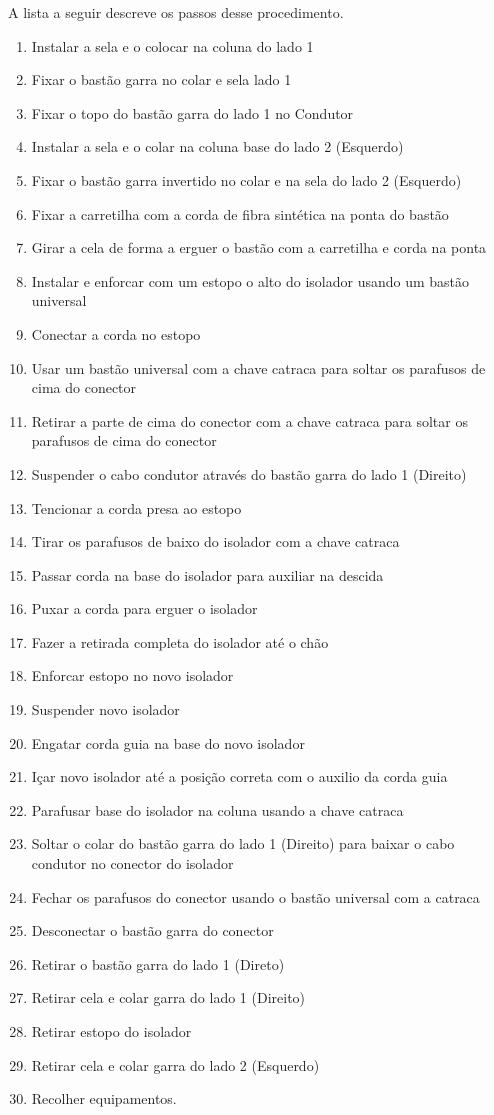 A lista a seguir descreve os passos desse procedimento.
\begin{enumerate}
\item Instalar a sela e o colocar na coluna do lado 1
\item Fixar o bastão garra no colar e sela lado 1
\item Fixar o topo do bastão garra do lado 1 no Condutor
\item Instalar a sela e o colar na coluna base do lado 2 (Esquerdo)
\item Fixar o bastão garra invertido no colar e na sela do lado 2 (Esquerdo)
\item Fixar a carretilha com a corda de fibra sintética na ponta do bastão
\item Girar a cela de forma a erguer o bastão com a carretilha e corda na ponta
\item Instalar e enforcar com um estopo o alto do isolador usando um bastão universal
\item Conectar a corda no estopo
\item Usar um bastão universal com a chave catraca para soltar os parafusos de cima do conector
\item Retirar a parte de cima do conector com a chave catraca para soltar os parafusos de cima do conector
\item Suspender o cabo condutor através do bastão garra do lado 1 (Direito)
\item Tencionar a corda presa ao estopo
\item Tirar os parafusos de baixo do isolador com a chave catraca
\item Passar corda na base do isolador para auxiliar na descida
\item Puxar a corda para erguer o isolador 
\item Fazer a retirada completa do isolador até o chão
\item Enforcar estopo no novo isolador
\item Suspender novo isolador
\item Engatar corda guia na base do novo isolador
\item Içar novo isolador até a posição correta com o auxilio da corda guia
\item Parafusar base do isolador na coluna usando a chave catraca
\item Soltar o colar do bastão garra do lado 1 (Direito) para baixar o cabo condutor no conector do isolador
\item Fechar os parafusos do conector usando o bastão universal com  a catraca
\item Desconectar o bastão garra do conector
\item Retirar o bastão garra do lado 1 (Direto)
\item Retirar cela e colar garra do lado 1 (Direito)
\item Retirar estopo do isolador
\item Retirar cela e colar garra do lado 2 (Esquerdo)
\item Recolher equipamentos.
\end{enumerate}

